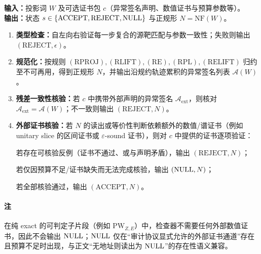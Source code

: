 \begin{algorithm}\label{alg:pw-aud-checker}
\textbf{输入：}投影词 $W$ 及可选证书包 $c$（异常签名声明、数值证书与预算参数等）。\\
\textbf{输出：}状态 $s\in\{\mathrm{ACCEPT},\mathrm{REJECT},\mathrm{NULL}\}$ 与正规形 $N=\mathrm{NF}(W)$。
\begin{enumerate}[label=(\arabic*), ref=\arabic*]
  \item \textbf{类型检查：}自左向右验证每一步复合的源靶匹配与参数一致性；失败则输出 $(\mathrm{REJECT},\epsilon)$。
  \item \textbf{规范化：}按规则 $(\mathrm{RPROJ}),(\mathrm{RLIFT}),(\mathrm{RE}),(\mathrm{RPL}),(\mathrm{RELIFT})$ 归约至不可再用，得到正规形 $N$，并输出沿规约轨迹累积的异常签名列表 $\mathcal{A}(W)$。
  \item \textbf{残差一致性核验：}若 $c$ 中携带外部声明的异常签名 $\mathcal{A}_{\mathrm{ext}}$，则核对 $\mathcal{A}_{\mathrm{ext}}=\mathcal{A}(W)$；不一致则输出 $(\mathrm{REJECT},N)$。
  \item \textbf{外部证书核验：}若 $N$ 的读出或等价性判断依赖额外的数值/谱证书（例如 unitary slice 的区间证书或 $\varepsilon$-sound 证书），则对 $c$ 中提供的证书逐项验证：\par
  \quad 若存在可核验反例（证书不通过、或与声明矛盾），输出 $(\mathrm{REJECT},N)$；\par
  \quad 若仅因预算不足/证书缺失而无法完成核验，输出 $(\mathrm{NULL},N)$；\par
  \quad 若全部核验通过，输出 $(\mathrm{ACCEPT},N)$。
\end{enumerate}
\end{algorithm}

\paragraph{注} 在纯 exact 的可判定子片段（例如 $\mathrm{PW}_{Z,E}$）中，检查器不需要任何外部数值证书，因此不会输出 $\mathrm{NULL}$；$\mathrm{NULL}$ 仅在“审计协议显式允许的外部证书通道”存在且预算不足时出现，与正文“无地址则读出为 $\mathrm{NULL}$”的存在性语义兼容。

